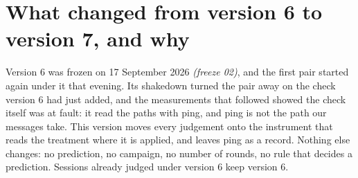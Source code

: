 \documentclass[11pt]{article}
\newcommand{\gl}[1]{{\color{soft}\itshape\small (#1)}}
\begin{document}
\section*{What changed from version 6 to version 7, and why}
Version 6 was frozen on 17 September 2026 \gl{freeze 02}, and the first pair started again under it that evening. Its shakedown turned the pair away on the check version 6 had just added, and the measurements that followed showed the check itself was at fault: it read the paths with ping, and ping is not the path our messages take. This version moves every judgement onto the instrument that reads the treatment where it is applied, and leaves ping as a record. Nothing else changes: no prediction, no campaign, no number of rounds, no rule that decides a prediction. Sessions already judged under version 6 keep version 6.
\end{document}
